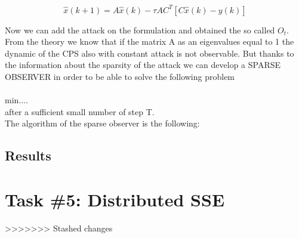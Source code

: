 \documentclass[a4paper,11pt]{article}
\begin{document}
    $$\hat{x}(k+1) = A\hat{x}(k) - \tau AC^T[C\hat{x}(k) - y(k)]$$

    Now we can add the attack on the formulation and obtained the so called  $O_t$. From the theory we know that if the matrix A as an eigenvalues equal to 1 the dynamic of the CPS also with constant attack is not observable.
    But thanks to the information about the sparsity of the attack we can develop a SPARSE OBSERVER in order to be able to solve the following problem \\
    \\min....
    \\after a sufficient small number of step T.
    \\The algorithm of the sparse observer is the following:
    
    
    
    
    
    \subsection*{Results}

    \section*{Task \#5: Distributed SSE}
>>>>>>> Stashed changes
\end{document}
